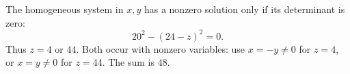 The homogeneous system in $x,y$ has a nonzero solution only if its determinant is zero:
\[20^2-(24-z)^2=0.\]
Thus $z=4$ or $44$. Both occur with nonzero variables: use $x=-y\ne0$ for $z=4$, or $x=y\ne0$ for $z=44$. The sum is $\boxed{48}$.
